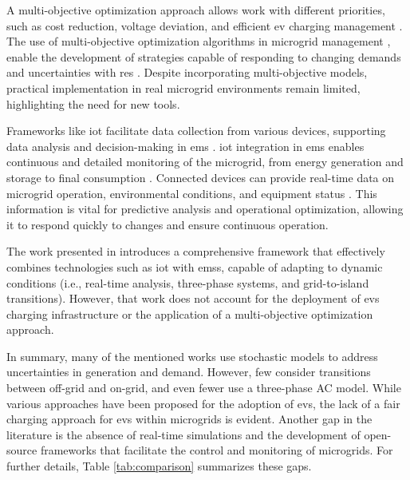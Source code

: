 \documentclass[preprint, 12pt, 3p]{elsarticle}
\begin{document}
A multi-objective optimization approach allows work with different 
priorities, such as cost reduction, voltage deviation, and 
efficient \gls{ev} charging management \cite{zandrazavi2022, li2024}. 
The use of multi-objective 
optimization algorithms in microgrid management \cite{abid24},
enable the development of strategies capable of responding to changing demands 
and uncertainties with \gls{res} \cite{zhang2022, mei2022}. Despite incorporating 
multi-objective models, practical implementation in real 
microgrid environments remain limited, highlighting the need 
for new tools.

Frameworks like \gls{iot} facilitate data collection from various devices, 
supporting data analysis and decision-making in \gls{ems} 
\cite{ullah2023,yehia2024}. 
\gls{iot} integration in \gls{ems} enables continuous and detailed monitoring 
of the microgrid, from energy generation and storage to final 
consumption \cite{pitchai2024}. Connected devices can provide real-time data 
on microgrid operation, environmental conditions, and equipment 
status \cite{mansouri2023}. This information is vital for predictive 
analysis and operational optimization, allowing it to respond 
quickly to changes and ensure continuous operation.

The work presented in \cite{silva2023} introduces a comprehensive framework
that effectively combines technologies such as \gls{iot} with 
\glspl{ems}, capable of adapting to dynamic conditions 
(i.e., real-time analysis, three-phase systems, and grid-to-island transitions).
However, that work does not account for the deployment of \glspl{ev} charging 
infrastructure or the application of a multi-objective optimization approach. 

In summary, many of the mentioned works use stochastic models to address 
uncertainties in generation and demand. However, few consider transitions 
between off-grid and on-grid, and even fewer use a three-phase AC model. While 
various approaches have been proposed for the adoption of \glspl{ev}, the lack
of a fair charging approach for \glspl{ev} within microgrids is evident. Another gap in the literature is the absence of real-time simulations and the development of open-source frameworks that facilitate the control and monitoring of microgrids. For further details, Table \ref{tab:comparison} summarizes these gaps.
\end{document}
